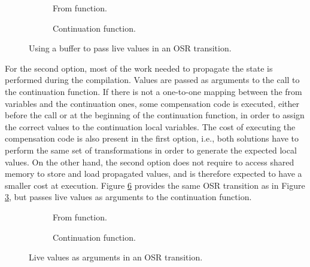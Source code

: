 \begin{figure}[h]
    \centering
    \begin{subfigure}{.49\textwidth}
        \caption{From function.}
        \label{fig:fromFuncBuff}
    \end{subfigure}
    \centering
    \begin{subfigure}{.49\textwidth}
        \caption{Continuation function.}
        \label{fig:ContFuncBuff}   
    \end{subfigure}
    \caption{Using a buffer to pass live values in an OSR transition.}
    \label{fig:bufferExample}
\end{figure}

For the second option, most of the work needed to propagate the state is performed during the compilation.
Values are passed as arguments to the call to the continuation function.
If there is not a one-to-one mapping between the from variables and the continuation ones, some compensation code is executed, either before the call or at the beginning of the continuation function, in order to assign the correct values to the continuation local variables.
The cost of executing the compensation code is also present in the first option, i.e., both solutions have to perform the same set of transformations in order to generate the expected local values.
On the other hand, the second option does not require to access shared memory to store and load propagated values, and is therefore expected to have a smaller cost at execution.
Figure \ref{fig:CallExample} provides the same OSR transition as in Figure \ref{fig:bufferExample}, but passes live values as arguments to the continuation function.\\

\begin{figure}[h]
    \centering
    \begin{subfigure}{.49\textwidth}
        \caption{From function.}
        \label{fig:fromFuncCall}
    \end{subfigure}
    \centering
    \begin{subfigure}{.49\textwidth}
        \caption{Continuation function.}
        \label{fig:ContFuncCall}   
    \end{subfigure}
    \caption{Live values as arguments in an OSR transition.}
    \label{fig:CallExample}
\end{figure}

